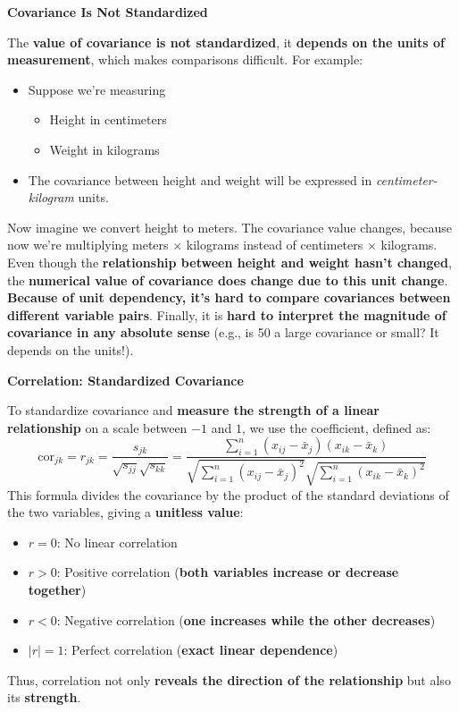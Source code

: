 \highspace
\begin{flushleft}
    \textcolor{Red2}{ \textbf{Covariance Is Not Standardized}}
\end{flushleft}
The \textbf{value of covariance is not standardized}, it \textbf{depends on the units of measurement}, which makes comparisons difficult. For example:
\begin{itemize}
    \item Suppose we're measuring
    \begin{itemize}
        \item Height in centimeters
        \item Weight in kilograms
    \end{itemize}
    \item The covariance between height and weight will be expressed in \emph{centimeter-kilogram} units.
\end{itemize}
Now imagine we convert height to meters. The covariance value changes, because now we're multiplying meters $\times$ kilograms instead of centimeters $\times$ kilograms. Even though the \textbf{relationship between height and weight hasn't changed}, the \textbf{numerical value of covariance does change due to this unit change}. \textbf{Because of unit dependency, it's hard to compare covariances between different variable pairs}. Finally, it is \textbf{hard to interpret the magnitude of covariance in any absolute sense} (e.g., is 50 a large covariance or small? It depends on the units!).

\highspace
\begin{flushleft}
    \textcolor{Green3}{ \textbf{Correlation: Standardized Covariance}}
\end{flushleft}
To standardize covariance and \textbf{measure the strength of a linear relationship} on a scale between $-1$ and $1$, we use the  coefficient, defined as:
\begin{equation}
    \text{cor}_{jk} = r_{jk} = \dfrac{s_{jk}}{\sqrt{s_{jj}}\sqrt{s_{kk}}} = \dfrac{
        \displaystyle\sum_{i=1}^{n}\left(x_{ij} - \bar{x}_{j}\right)\left(x_{ik} - \bar{x}_{k}\right)
    }{
        \sqrt{\displaystyle\sum_{i=1}^{n}\left(x_{ij} - \bar{x}_{j}\right)^{2}} \sqrt{\displaystyle\sum_{i=1}^{n}\left(x_{ik} - \bar{x}_{k}\right)^{2}}
    }
\end{equation}
This formula divides the covariance by the product of the standard deviations of the two variables, giving a \textbf{unitless value}:
\begin{itemize}
    \item $ r = 0 $: No linear correlation
    \item $ r > 0 $: Positive correlation (\textbf{both variables increase or decrease together})
    \item $ r < 0 $: Negative correlation (\textbf{one increases while the other decreases})
    \item $ \left|r\right| = 1 $: Perfect correlation (\textbf{exact linear dependence})
\end{itemize}
Thus, correlation not only \textbf{reveals the direction of the relationship} but also its \textbf{strength}.

